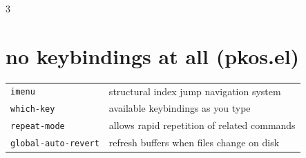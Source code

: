 \documentclass[11pt,landscape,a4paper]{article}
\begin{document}
\begin{multicols}{3}
%

%
%
%

\vfill\null

\section{no keybindings at all (pkos.el)} 

\begin{tabular}{@{}ll@{}}
\verb|imenu|  &  structural index jump navigation system\\
	
\verb|which-key|  & available keybindings as you type\\
\verb|repeat-mode|  & allows rapid repetition of related commands\\
\verb|global-auto-revert|  & refresh buffers when files change on disk\\
\end{tabular}


\end{multicols}
\end{document}
